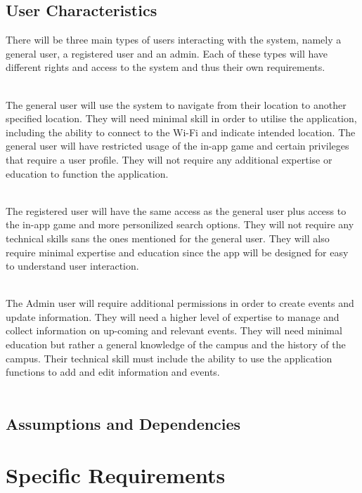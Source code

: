 \documentclass{article}
\begin{document}
    	\subsection{User Characteristics}  
{There will be three main types of users interacting with the system, namely a general user, a registered user and an admin. Each of these types will have different rights and access to the system and thus their own requirements.\\\\}

{The general user will use the system to navigate from their location to another specified location. They will need minimal skill in order to utilise the application, including the ability to connect to the Wi-Fi and indicate intended location. The general user will have restricted usage of the in-app game and certain privileges that require a user profile. They will not require any additional expertise or education to function the application.\\\\}

{The registered user will have the same access as the general user plus access to the in-app game and more personilized search options. They will not require any technical skills sans the ones mentioned for the general user. They will also require minimal expertise and education since the app will be designed for easy to understand user interaction.\\\\}

{The Admin user will require additional permissions in order to create events and update information. They will need a higher level of expertise to manage and collect information on up-coming and relevant events. They will need minimal education but rather a general knowledge of the campus and the history of the campus. Their technical skill must include the ability to use the application functions to add and edit information and events.\\\\} 
   
    	\subsection{Assumptions and Dependencies}
    	

	\section{Specific Requirements}
   
\end{document}
